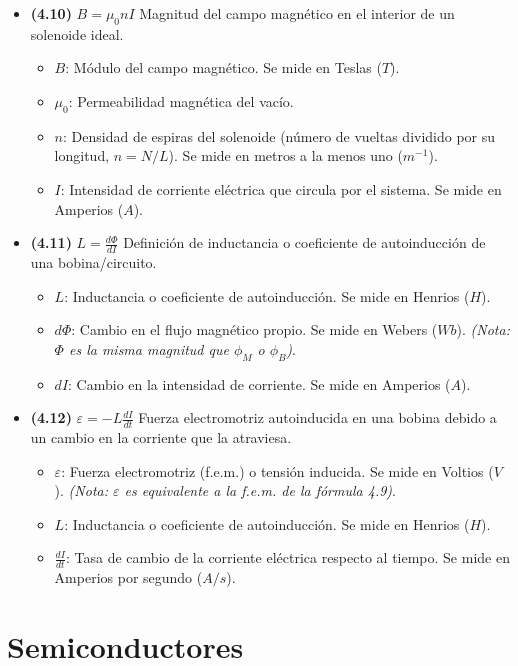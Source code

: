 \documentclass{article}
\begin{document}
\begin{itemize}
				\item \textbf{(4.10)} $\boxed{B = \mu_0 n I}$ Magnitud del campo magnético en el interior de un solenoide ideal.
					\begin{itemize}
						\item $B$: Módulo del campo magnético. Se mide en Teslas ($T$).
						\item $\mu_0$: Permeabilidad magnética del vacío.
						\item $n$: Densidad de espiras del solenoide (número de vueltas dividido por su longitud, $n = N/L$). Se mide en metros a la menos uno ($m^{-1}$).
						\item $I$: Intensidad de corriente eléctrica que circula por el sistema. Se mide en Amperios ($A$).
					\end{itemize}

				\item \textbf{(4.11)} $\boxed{L = \frac{d\Phi}{dI}}$ Definición de inductancia o coeficiente de autoinducción de una bobina/circuito.
					\begin{itemize}
						\item $L$: Inductancia o coeficiente de autoinducción. Se mide en Henrios ($H$).
						\item $d\Phi$: Cambio en el flujo magnético propio. Se mide en Webers ($Wb$). \textit{(Nota: $\Phi$ es la misma magnitud que $\phi_M$ o $\phi_B$)}.
						\item $dI$: Cambio en la intensidad de corriente. Se mide en Amperios ($A$).
					\end{itemize}

				\item \textbf{(4.12)} $\boxed{\varepsilon = -L \frac{dI}{dt}}$ Fuerza electromotriz autoinducida en una bobina debido a un cambio en la corriente que la atraviesa.
					\begin{itemize}
						\item $\varepsilon$: Fuerza electromotriz (f.e.m.) o tensión inducida. Se mide en Voltios ($V$). \textit{(Nota: $\varepsilon$ es equivalente a la f.e.m. de la fórmula 4.9)}.
						\item $L$: Inductancia o coeficiente de autoinducción. Se mide en Henrios ($H$).
						\item $\frac{dI}{dt}$: Tasa de cambio de la corriente eléctrica respecto al tiempo. Se mide en Amperios por segundo ($A/s$).
					\end{itemize}
			\end{itemize}

	\section{Semiconductores}
\end{document}
